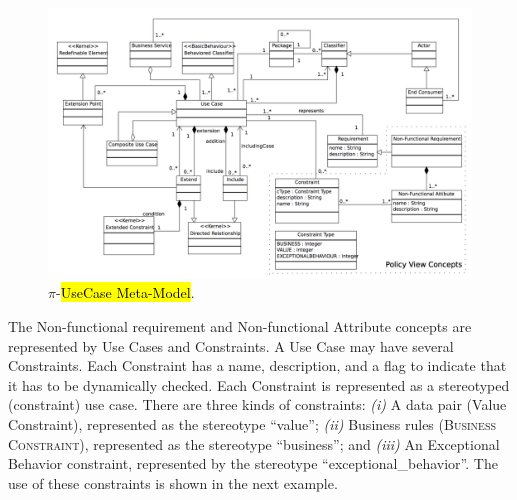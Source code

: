 \documentclass{singlecol-new}
\theoremstyle{TH}{
\newtheorem{lemma}{Lemma}
\newtheorem{theorem}[lemma]{Theorem}
\newtheorem{corrolary}[lemma]{Corrolary}
\newtheorem{conjecture}[lemma]{Conjecture}
\newtheorem{proposition}[lemma]{Proposition}
\newtheorem{claim}[lemma]{Claim}
\newtheorem{stheorem}[lemma]{Wrong Theorem}
\newtheorem{algorithm}{Algorithm}
}
\theoremstyle{THrm}{
\newtheorem{definition}{Definition}[section]
\newtheorem{question}{Question}[section]
\newtheorem{remark}{Remark}
\newtheorem{scheme}{Scheme}
}
\theoremstyle{THhit}{
\newtheorem{case}{Case}[section]
}
\theoremstyle{THhsl}{
\newtheorem{example}{Example}
}
\begin{document}
 \begin{figure}[h]
\center
\includegraphics[width=1\textwidth]{./figures/UseCaseMetaModel.pdf}
\caption{\label{fig:CIM:usecasemetamodel} $\pi$-\hl{UseCase Meta-Model}.}
\end{figure}


 The {\sc Non-functional requirement} and {\sc Non-functional Attribute} concepts are represented by {\sc Use Cases} and {\sc Constraints}.
A {\sc Use Case} may have several {\sc Constraints}. Each {\sc Constraint} has a name, description, and a flag to indicate that it has to be  dynamically checked.
Each {\sc Con\-straint} is represented as a stereotyped ({\sf constraint})\footnotemark {} use case.
There are three kinds of constraints:
\textit{(i)} A data pair ({\sc Value Constraint}), represented as the stereotype ``value'';
\textit{(ii)} Business rules (\textsc{Business Constraint}), represented as the stereotype {\sf ``business''}; and
\textit{(iii)} An {\sc Exceptional Behavior} constraint, represented by the stereotype {\sf ``exceptional\_behavior''}.
The use of these constraints is shown in the next example.
\end{document}
